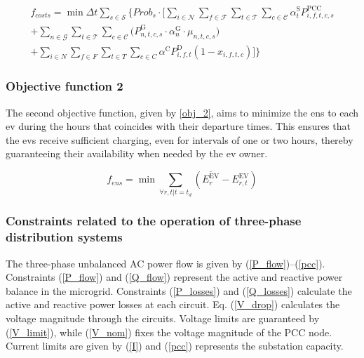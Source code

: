 \documentclass[preprint, 10pt, 5p]{elsarticle}
\begin{document}
\vspace{-15pt}
\begin{multline}\label{obj_1}
{f_{costs}} = \min \Delta t \sum_{s \in \mathcal{S}} 
    \Biggl\{ \mathit{Prob}_{s} \cdot \Bigg[
        \sum_{i \in \mathcal{N}} 
        \sum_{f \in \mathcal{F}} 
        \sum_{t \in \mathcal{T}} 
        \sum_{c \in \mathcal{C}} 
\alpha_{t}^{\text{S}} P_{i,f,t,c,s}^{\text{PCC}}  \\
    + \sum_{n \in \mathcal{G}} 
    \sum_{t \in \mathcal{T}} 
    \sum_{c \in \mathcal{C}} 
\Big(P^{\text{G}}_{n,t,c,s} \cdot \alpha_{n}^{\text{G}} \cdot \mu_{n,t,c,s} \Big)  \\
    + \sum_{i \in \mathit{N}} 
    \sum_{f \in \mathit{F}}
    \sum_{t \in \mathit{T}}
    \sum_{c \in \mathit{C}} \alpha^{\text{C}} P_{i,f,t}^{\text{D}} 
        (1 - x_{i,f,t,c}) \Bigg] \Biggr\} 
\end{multline}
\vspace{-12pt}

\subsubsection{Objective function 2}

The second objective function, given by \eqref{obj_2}, aims to minimize the 
\gls{ens} to each \gls{ev} during the hours that coincides with their 
departure times.  This ensures that the \glspl{ev} receive sufficient charging, 
even for intervals of one or two hours, thereby guaranteeing their 
availability when needed by the \gls{ev} owner.

\begin{equation}\label{obj_2}
{f_{ens}} = \min \sum_{\forall r,t | t=t_{d}} 
    \left( \overline{{E}_{r}^{\mathrm{EV}}} - {E}_{r,t}^{\mathrm{EV}} \right)
\end{equation}

\subsubsection{Constraints related to the operation of three-phase distribution systems}

The three-phase unbalanced AC power flow is given by 
(\ref{P_flow})–(\ref{pcc}). 
Constraints (\ref{P_flow}) and (\ref{Q_flow}) 
represent the active and reactive power balance in the microgrid. 
Constraints (\ref{P_losses}) and (\ref{Q_losses}) 
calculate the active and reactive power losses at each circuit. 
Eq. (\ref{V_drop}) calculates the voltage 
magnitude through the circuits.
Voltage limits are guaranteed by (\ref{V_limit}), while (\ref{V_nom}) 
fixes the voltage magnitude of the PCC node.  
Current limits are given by (\ref{I}) and (\ref{pcc}) represents 
the substation capacity.
\end{document}
